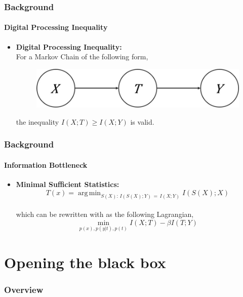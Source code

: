 \documentclass[10pt]{beamer}
\DeclareMathOperator*{\argmin}{arg\,min}
\begin{document}
\begin{frame}
\frametitle{Background}
\framesubtitle{Digital Processing Inequality}
\begin{itemize}
\item \textbf{Digital Processing Inequality:} \\[0.5cm]
For a Markov Chain of the following form,
\begin{figure}
\vspace*{2mm}
\centering
\includegraphics[scale=0.18]{figs/dpi.jpeg}
\end{figure}
\vspace*{2mm}
the inequality $I(X;T) \geq I(X;Y)$ is valid.
\end{itemize}
\end{frame}

\begin{frame}
\frametitle{Background}
\framesubtitle{Information Bottleneck}
\begin{itemize}
\item \textbf{Minimal Sufficient Statistics:} $$ T(x) = \argmin_{S(X):\, I(S(X);Y) \,=\, I(X;Y)} I(S(X);X)$$\\[0.25cm]
which can be rewritten with as the following Lagrangian, $$ \min_{p(x),p(y|t),p(t)} I(X;T) - \beta I(T;Y)$$
\end{itemize}
\end{frame}

\section{Opening the black box} 

\begin{frame}
\frametitle{Overview}
\tableofcontents[currentsection,subsectionstyle=shaded]
\end{frame}
\end{document}
